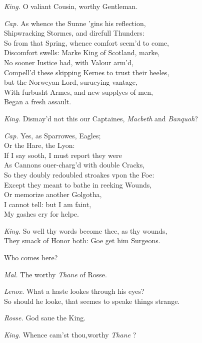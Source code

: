 \documentclass[12pt]{sides}
\newcommand{\dia}[1]{\hskip 15pt\textit{#1}\hskip 6pt}
\begin{document}
\begin{multicols}{2}
			\dia{King.} O valiant Cousin, worthy Gentleman.
			
			\dia{Cap.} As whence the Sunne 'gins his reflection, \\ Shipwracking Stormes, and direfull Thunders: \\ So from that Spring, whence comfort seem'd to come, \\ Discomfort swells: Marke King of Scotland, marke, \\ No sooner Iustice had, with Valour arm'd, \\ Compell'd these skipping Kernes to trust their heeles, \\ but the Norweyan Lord, surueying vantage, \\ With furbusht Armes, and new supplyes of men, \\ Began a fresh assault.
			
			\dia{King.} Dismay'd not this our Captaines, \textit{Macbeth} and \textit{Banquoh}?
			
			\dia{Cap.} Yes, as Sparrowes, Eagles; \\ Or the Hare, the Lyon: \\ If I say sooth, I must report they were \\ As Cannons ouer-charg'd with double Cracks, \\ So they doubly redoubled stroakes vpon the Foe: \\ Except they meant to bathe in reeking Wounds, \\ Or memorize another Golgotha, \\ I cannot tell: but I am faint, \\ My gashes cry for helpe.
			
			\dia{King.} So well thy words become thee, as thy wounds, \\ They smack of Honor both: Goe get him Surgeons.
			
			Who comes here?
			
			\dia{Mal.} The worthy \textit{Thane} of Rosse.
			 
			\dia{Lenox.} What a haste lookes through his eyes? \\ So should he looke, that seemes to speake things strange.
			
			\dia{Rosse.} God saue the King.
			
			\dia{King.} Whence cam'st thou,worthy \textit{Thane} ?
			

\end{multicols}
\end{document}
